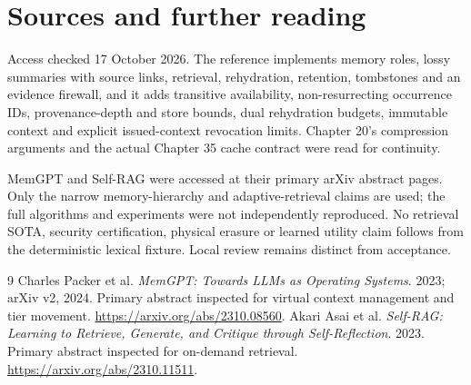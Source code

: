 \chapter*{Sources and further reading}
Access checked 17 October 2026. The reference implements memory roles, lossy summaries with source links, retrieval, rehydration, retention, tombstones and an evidence firewall, and it adds
transitive availability, non-resurrecting occurrence IDs, provenance-depth
and store bounds, dual rehydration budgets, immutable context and explicit
issued-context revocation limits. Chapter 20's compression arguments and the
actual Chapter 35 cache contract were read for continuity.

MemGPT and Self-RAG were accessed at their primary arXiv abstract pages.
Only the narrow memory-hierarchy and adaptive-retrieval claims are used;
the full algorithms and experiments were not independently reproduced.
No retrieval SOTA, security certification, physical erasure or learned utility
claim follows from the deterministic lexical fixture. Local review remains distinct from acceptance.
\begingroup
\renewcommand{\bibname}{References}
\let\chapter\section
\begin{thebibliography}{9}
 Charles Packer et al.
\emph{MemGPT: Towards LLMs as Operating Systems}. 2023; arXiv v2, 2024.
Primary abstract inspected for virtual context management and tier movement.
\url{https://arxiv.org/abs/2310.08560}.
 Akari Asai et al.
\emph{Self-RAG: Learning to Retrieve, Generate, and Critique through
Self-Reflection}. 2023. Primary abstract inspected for on-demand retrieval.
\url{https://arxiv.org/abs/2310.11511}.
\end{thebibliography}
\endgroup
